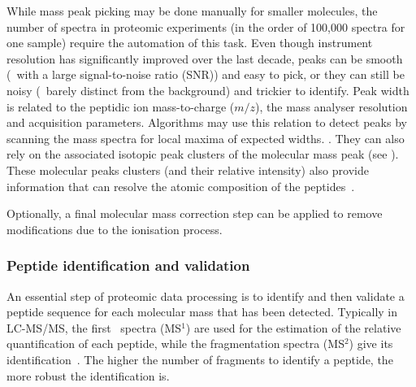 While mass peak picking may be done manually for smaller molecules,
the number of spectra in proteomic experiments
(in the order of 100,000 spectra for one sample)
require the automation of this task.
Even though instrument resolution has significantly improved over the last decade,
peaks can be smooth (\ie\ with a large signal-to-noise ratio (\gls{SNR}))
and easy to pick, or they can still be noisy
(\ie\ barely distinct from the background) and trickier to identify.
Peak width is related to the peptidic ion mass-to-charge ($m/z$),
the mass analyser resolution and acquisition parameters.
Algorithms may use this relation to detect peaks by
scanning the mass spectra for local maxima of expected widths. .
They can also rely on
the associated isotopic peak clusters of the molecular mass peak
(see ).
These molecular peaks clusters (and their relative intensity) also provide
information that can resolve the atomic composition of the peptides~.\mybr\

Optionally, a final molecular mass correction step can be applied to remove
modifications due to the ionisation process.\mybr\


\subsubsection{Peptide identification and validation}\label{subsub:peptideID}

An essential step of proteomic data processing is to identify and then validate
a peptide sequence for each molecular mass that has been detected.
Typically in \gls{LC-MS/MS},
the first \ms\ spectra (MS$^1$) are used for the estimation of the relative
quantification of each peptide,
while the fragmentation spectra (MS$^2$) give its identification~.
The higher the number of fragments to identify a peptide,
the more robust the identification is.\mybr\

